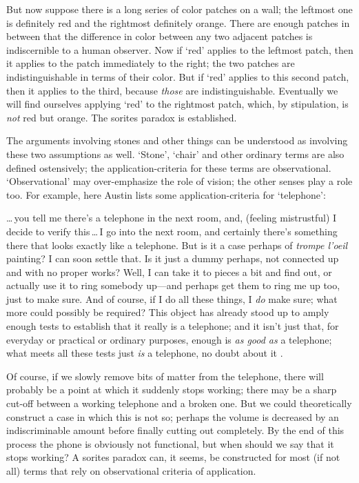 \documentclass[11pt]{standalone}
\newenvironment{squote}{%
\begin{spacing}{1}
       	\begin{list}{}{%
\setlength{\labelwidth}{0pt}%
\rightmargin\leftmargin%
}
\item\relax
}{%
\end{list}%
\end{spacing}
}
\begin{document}
\begin{spacing}{1.5}
But now suppose there is a long series of color patches on a wall; the
leftmost one is definitely red and the rightmost definitely orange.
There are enough patches in between that the difference in color
between any two adjacent patches is indiscernible to a human observer.
Now if `red' applies to the leftmost patch, then it applies to the
patch immediately to the right; the two patches are indistinguishable
in terms of their color.  But if `red' applies to this second patch,
then it applies to the third, because \emph{those} are
indistinguishable.  Eventually we will find ourselves applying `red'
to the rightmost patch, which, by stipulation, is \emph{not} red but
orange.  The sorites paradox is established.

The arguments involving stones and other things can be understood as
involving these two assumptions as well.  `Stone', `chair' and other
ordinary terms are also defined ostensively; the application-criteria
for these terms are observational.  `Observational' may over-emphasize
the role of vision; the other senses play a role too.  For example,
here Austin lists some application-criteria for `telephone':

\begin{squote}
\ldots\,you tell me there's a telephone in the next room, and,
(feeling mistrustful) I decide to verify this\,\ldots\,I go into the
next room, and certainly there's something there that looks exactly
like a telephone.  But is it a case perhaps of \emph{trompe l'oeil}
painting?  I can soon settle that.  Is it just a dummy perhaps, not
connected up and with no proper works?  Well, I can take it to pieces
a bit and find out, or actually use it to ring somebody up---and
perhaps get them to ring me up too, just to make sure.  And of course,
if I do all these things, I \emph{do} make sure; what more could
possibly be required?  This object has already stood up to amply
enough tests to establish that it really is a telephone; and it isn't
just that, for everyday or practical or ordinary purposes, enough is
\emph{as good as} a telephone; what meets all these tests just
\emph{is} a telephone, no doubt about it \citep[118--119]{austin1964}.
\end{squote}

Of course, if we slowly remove bits of matter from the telephone,
there will probably be a point at which it suddenly stops working;
there may be a sharp cut-off between a working telephone and a broken
one.  But we could theoretically construct a case in which this is not
so; perhaps the volume is decreased by an indiscriminable amount
before finally cutting out completely.  By the end of this process the
phone is obviously not functional, but when should we say that it
stops working?  A sorites paradox can, it seems, be constructed for
most (if not all) terms that rely on observational criteria of
application.


\end{spacing}
\end{document}
